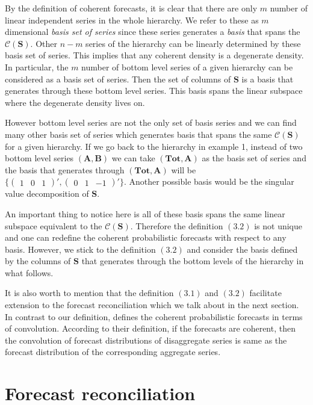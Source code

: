 \documentclass[a4paper, 11pt]{article}
\begin{document}
By the definition of coherent forecasts, it is clear that there are only $m$ number of linear independent series in the whole hierarchy. We refer to these as $m$ dimensional \textit{basis set of series} since these series generates a \textit{basis} that spans the $\mathscr{C}(\bm{S})$. Other $n-m$ series of the hierarchy can be linearly determined by these basis set of series. This implies that any coherent density is a degenerate density. In particular, the $m$ number of bottom level series of a given hierarchy can be considered as a basis set of series. Then the set of columns of $\bm{S}$ is a basis that generates through these bottom level series. This basis spans the linear subspace where the degenerate density lives on.

However bottom level series are not the only set of basis series and we can find many other basis set of series which generates basis that spans the same $\mathscr{C}(\bm{S})$ for a given hierarchy. If we go back to the hierarchy in example 1, instead of two bottom level series $(\bm{A,B})$ we can take $(\bm{Tot,A})$ as the basis set of series and the basis that generates through $(\bm{Tot,A})$ will be
$\{
  \begin{pmatrix} 1&0&1 \end{pmatrix}',
  \begin{pmatrix} 0&1&-1 \end{pmatrix}'\}$.
Another possible basis would be the singular value decomposition of $\bm{S}$.

An important thing to notice here is all of these basis spans the same linear subspace equivalent to the $\mathscr{C}(\bm{S})$. Therefore the definition $(3.2)$ is not unique and one can redefine the coherent probabilistic forecasts with respect to any basis. However, we stick to the definition $(3.2)$ and consider the basis defined by the columns of $\bm{S}$ that generates through the bottom levels of the hierarchy in what follows.

It is also worth to mention that the definition $(3.1)$ and $(3.2)$ facilitate extension to the forecast reconciliation which we talk about in the next section. In contrast to our definition, \citet{BenTaieb2017} defines the coherent probabilistic forecasts in terms of convolution. According to their definition, if the forecasts are coherent, then the convolution of forecast distributions of disaggregate series is same as the forecast distribution of the corresponding aggregate series.

\section{Forecast reconciliation}
\end{document}
